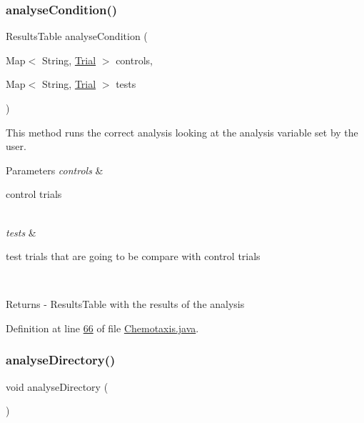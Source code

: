 \subsubsection{\texorpdfstring{analyse\+Condition()}{analyseCondition()}}
{\footnotesize\ttfamily Results\+Table analyse\+Condition (\begin{DoxyParamCaption}\item[{Map$<$ String, \hyperlink{classdata_1_1_trial}{Trial} $>$}]{controls,  }\item[{Map$<$ String, \hyperlink{classdata_1_1_trial}{Trial} $>$}]{tests }\end{DoxyParamCaption})\hspace{0.3cm}{\ttfamily [private]}}

This method runs the correct analysis looking at the analysis variable set by the user.


\begin{DoxyParams}{Parameters}
{\em controls} & 
\begin{DoxyItemize}
\item control trials 
\end{DoxyItemize}\\
\hline
{\em tests} & 
\begin{DoxyItemize}
\item test trials that are going to be compare with control trials 
\end{DoxyItemize}\\
\hline
\end{DoxyParams}
\begin{DoxyReturn}{Returns}
-\/ Results\+Table with the results of the analysis 
\end{DoxyReturn}


Definition at line \hyperlink{_chemotaxis_8java_source_l00066}{66} of file \hyperlink{_chemotaxis_8java_source}{Chemotaxis.\+java}.

\hypertarget{classanalysis_1_1_chemotaxis_ad8447fb7554f7f126822c7a3f3f680ce}{}\label{classanalysis_1_1_chemotaxis_ad8447fb7554f7f126822c7a3f3f680ce} 
\subsubsection{\texorpdfstring{analyse\+Directory()}{analyseDirectory()}}
{\footnotesize\ttfamily void analyse\+Directory (\begin{DoxyParamCaption}{ }\end{DoxyParamCaption})\hspace{0.3cm}{\ttfamily [private]}}

